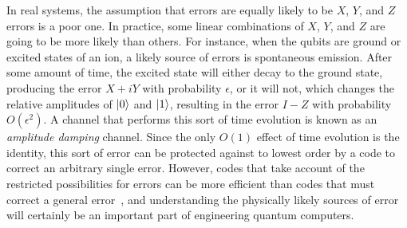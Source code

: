 In real systems, the assumption that errors are equally likely to be $X$,
$Y$, and $Z$ errors is a poor one.  In practice, some linear combinations
of $X$, $Y$, and $Z$ are going to be more likely than others.  For instance,
when the qubits are ground or excited states of an ion, a likely source of
errors is spontaneous emission.  After some amount of time, the excited
state will either decay to the ground state, producing the error $X + iY$
with probability $\epsilon$, or it will not, which changes the relative
amplitudes of $\ket{0}$ and $\ket{1}$, resulting in the error $I - Z$ with
probability $O (\epsilon^2)$.  A channel that performs this sort of time
evolution is known as an {\em amplitude damping} channel.  Since the only
$O(1)$ effect of time evolution is the identity, this sort of error can be
protected against to lowest order by a code to correct an arbitrary single
error.  However, codes that take account of the restricted possibilities
for errors can be more efficient than codes that must correct a general
error~\cite{leung}, and understanding the physically likely sources of
error will certainly be an important part of engineering quantum computers.